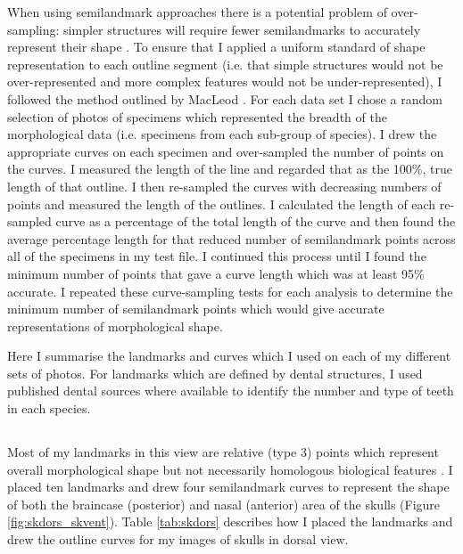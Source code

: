	When using semilandmark approaches there is a potential problem of over-sampling: simpler structures will require fewer semilandmarks to accurately represent their shape  \citep{MacLeod2012}. To ensure that I applied a uniform standard of shape representation to each outline segment (i.e. that simple structures would not be over-represented and more complex features would not be under-represented), I followed the method outlined by MacLeod \citeyearpar{MacLeod2012}. For each data set I chose a random selection of photos of specimens which represented the breadth of the morphological data (i.e. specimens from each sub-group of species). I drew the appropriate curves on each specimen and over-sampled the number of points on the curves. I measured the length of the line and regarded that as the 100\%, true length of that outline. I then re-sampled the curves with decreasing numbers of points and measured the length of the outlines. I calculated the length of each re-sampled curve as a percentage of the total length of the curve and then found the average percentage length for that reduced number of semilandmark points across all of the specimens in my test file. I continued this process until I found the minimum number of points that gave a curve length which was at least 95\% accurate.  I repeated these curve-sampling tests for each analysis to determine the minimum number of semilandmark points which would give accurate representations of morphological shape.
	
	Here I summarise the landmarks and curves which I used on each of my different sets of photos. For landmarks which are defined by dental structures, I used published dental sources \citep{Repenning1967, Eisenberg1969, Nowak1983, MacPhee1987, KnoxJones1992, Davis1997, Querouil2001, Nagorsen2002, Wilson2005, Goodman2006, Karatas2007, Hoffmann2008, Asher2008,  Muldoon2009, Lin2010} where available to identify the number and type of teeth in each species.
	
\subsection{}
	Most of my landmarks in this view are relative (type 3) points which represent overall morphological shape but not necessarily homologous biological features \citep{Zelditch2012}. I placed ten landmarks and drew four semilandmark curves to represent the shape of both the braincase (posterior) and nasal (anterior) area of the skulls (Figure \ref{fig:skdors_skvent}). Table \ref{tab:skdors} describes how I placed the landmarks and drew the outline curves for my images of skulls in dorsal view.


